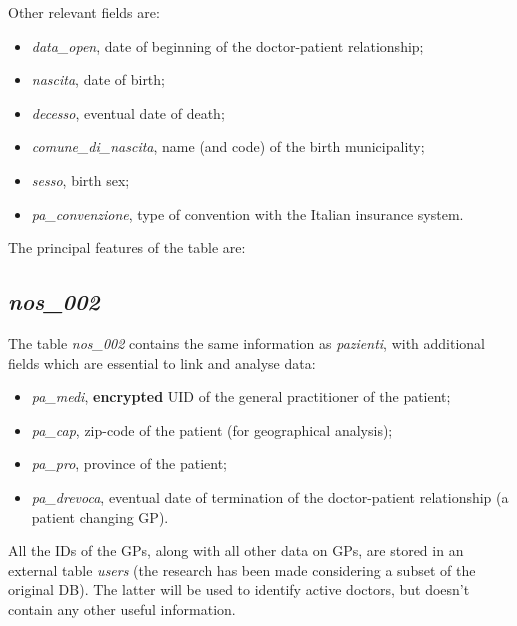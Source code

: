 Other relevant fields are:
\begin{itemize}
	\item \textit{data\_open}, date of beginning of the doctor-patient relationship;
	\item \textit{nascita}, date of birth;
	\item \textit{decesso}, eventual date of death;
	\item \textit{comune\_di\_nascita}, name (and code) of the birth municipality;
	\item \textit{sesso}, birth sex;
	\item \textit{pa\_convenzione}, type of convention with the Italian insurance system.
\end{itemize}

The principal features of the table are:

\subsection{\textit{nos\_002}}
The table \textit{nos\_002} contains the same information as \textit{pazienti}, with additional fields which are essential to link and analyse data:
\begin{itemize}
	\item \textit{pa\_medi}, \textbf{encrypted} UID of the general practitioner of the patient;
	\item \textit{pa\_cap}, zip-code of the patient (for geographical analysis);
	\item \textit{pa\_pro}, province of the patient;
	\item \textit{pa\_drevoca}, eventual date of termination of the doctor-patient relationship (a patient changing GP).
\end{itemize}

All the IDs of the GPs, along with all other data on GPs, are stored in an external table \textit{users} (the research has been made considering a subset of the original DB). The latter will be used to identify active doctors, but doesn't contain any other useful information.


